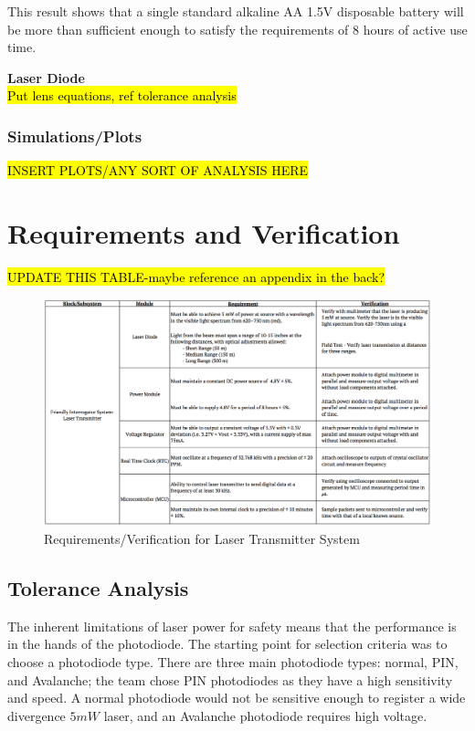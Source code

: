 \documentclass[letterpaper,10pt]{article}
\begin{document}
\begin{spacing}{1.15}
This result shows that a single standard alkaline AA 1.5V disposable battery will be more than sufficient enough to satisfy the requirements of 8 hours of active use time.

\normalsize\textbf{Laser Diode} \\
\hl{Put lens equations, ref tolerance analysis}

\subsubsection{Simulations/Plots}
\hl{INSERT PLOTS/ANY SORT OF ANALYSIS HERE}


\section{Requirements and Verification}
\hl{UPDATE THIS TABLE-maybe reference an appendix in the back?}
\begin{figure} [H]
	\centering
	\includegraphics[scale=0.3]{Requirements.png}
	\caption{Requirements/Verification for Laser Transmitter System\label{fig:requirements}}
\end{figure}
\subsection{Tolerance Analysis} \label{section-tolerance-analysis}
The inherent limitations of laser power for safety means that the performance is in the hands of the photodiode. The starting point for selection criteria was to choose a photodiode type. There are three main photodiode types: normal, PIN, and Avalanche; the team chose PIN photodiodes as they have a high sensitivity and speed. A normal photodiode would not be sensitive enough to register a wide divergence $5mW$ laser, and an Avalanche photodiode requires high voltage. 


\end{spacing}
\end{document}
